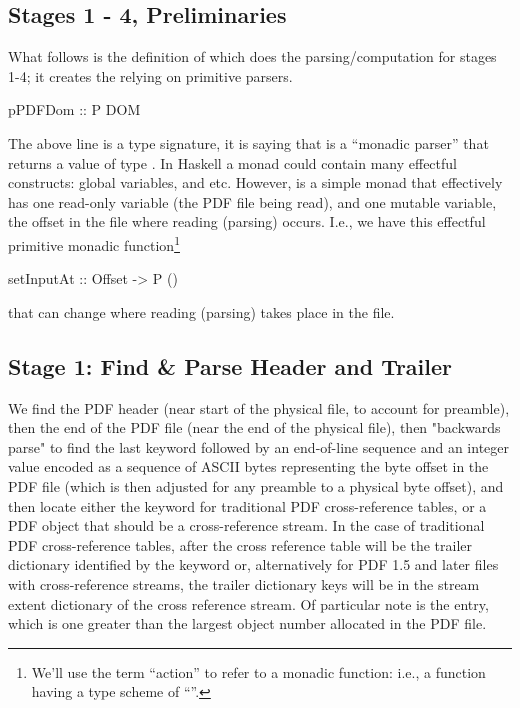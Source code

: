 \subsection{Stages 1 - 4, Preliminaries}

\iffalse
\begin{code}
{-# LANGUAGE EmptyDataDecls, TypeOperators, LambdaCase #-}
module Spec where
import           Control.Monad
import           Data.Char
import           Data.Foldable(foldlM)
import qualified Data.Map as M
import           Data.Map(Map)
import           Types
import           Utils
import           Primitives
\end{code}
\fi

What follows is the definition of  which does the
parsing/computation for stages 1-4;
it creates the  relying on primitive parsers.
\begin{code}
pPDFDom :: P DOM
\end{code}
The above line is a type signature, it is saying that
 is a ``monadic parser''  that returns a
value of type .
In Haskell a monad could contain many effectful constructs: global variables,
and etc. However,  is a simple monad that effectively has one
read-only variable (the PDF file being read), and one mutable variable,
the offset in the file where reading (parsing) occurs.  I.e., we have
this effectful primitive monadic function\footnote{
  We'll use the term ``action'' to refer to a monadic function:
  i.e., a function having a type scheme of ``''.
}
\begin{codeNoExecute}
setInputAt :: Offset -> P ()
\end{codeNoExecute}
that can change where reading (parsing) takes place in the file.

\subsection{Stage 1: Find \& Parse Header and Trailer}

We find the PDF header  (near start of the physical file, to
account for preamble), then the end of the PDF file  (near the
end of the physical file), then "backwards parse" to find the last
 keyword followed by an end-of-line sequence and an integer
value encoded as a sequence of ASCII bytes representing the byte offset in the
PDF file (which is then adjusted for any preamble to a physical byte offset),
and then locate either the  keyword for traditional PDF
cross-reference tables, or a PDF object that should be a cross-reference
stream. In the case of traditional PDF cross-reference tables, after the cross
reference table will be the trailer dictionary identified by the 
keyword or, alternatively for PDF 1.5 and later files with cross-reference
streams, the trailer dictionary keys will be in the stream extent dictionary of
the cross reference stream. Of particular note is the  entry, which
is one greater than the largest object number allocated in the PDF file.


